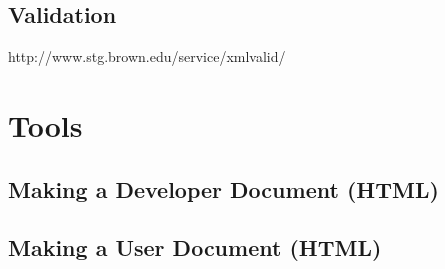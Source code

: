 \documentclass{article}
\newcommand{\SUBSECvalidation}{Validation}
\newcommand{\SECtools}{Tools}
\newcommand{\SUBSECmakeDevHtmlDoc}{Making a Developer Document (HTML)}
\newcommand{\SUBSECmakeUserHtmlDoc}{Making a User Document (HTML)}
\begin{document}
\subsection{\SUBSECvalidation}
\label{\SUBSECvalidation}

http://www.stg.brown.edu/service/xmlvalid/

\section{\SECtools}
\label{\SECtools}


\subsection{\SUBSECmakeDevHtmlDoc}
\label{\SUBSECmakeDevHtmlDoc}


\subsection{\SUBSECmakeUserHtmlDoc}
\label{\SUBSECmakeUserHtmlDoc}
\end{document}
